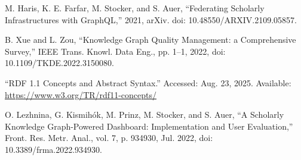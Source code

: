 \documentclass[12pt,a4paper]{article}
\begin{document}
\begin{thebibliography}{99}
 M. Haris, K. E. Farfar, M. Stocker, and S. Auer, “Federating Scholarly Infrastructures with GraphQL,” 2021, arXiv. doi: 10.48550/ARXIV.2109.05857.

 B. Xue and L. Zou, “Knowledge Graph Quality Management: a Comprehensive Survey,” IEEE Trans. Knowl. Data Eng., pp. 1–1, 2022, doi: 10.1109/TKDE.2022.3150080.

 “RDF 1.1 Concepts and Abstract Syntax.” Accessed: Aug. 23, 2025. Available: \url{https://www.w3.org/TR/rdf11-concepts/}

 O. Lezhnina, G. Kismihók, M. Prinz, M. Stocker, and S. Auer, “A Scholarly Knowledge Graph-Powered Dashboard: Implementation and User Evaluation,” Front. Res. Metr. Anal., vol. 7, p. 934930, Jul. 2022, doi: 10.3389/frma.2022.934930.

\end{thebibliography}
\end{document}
